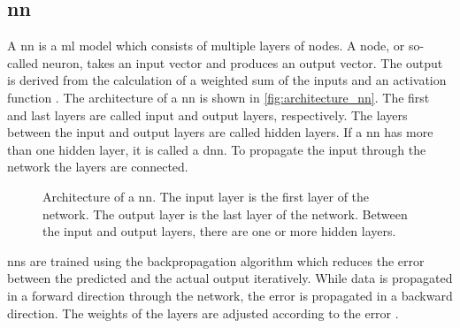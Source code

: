 \subsection{\acl*{nn}}\label{sec:neural_network}

A \ac{nn} is a \ac{ml} model which consists of multiple layers of nodes.
A node, or so-called neuron, takes an input vector and produces an output vector.
The output is derived from the calculation of a weighted sum of the inputs and an activation function \cite{KI2022}.
The architecture of a \ac{nn} is shown in \autoref{fig:architecture_nn}.
The first and last layers are called input and output layers, respectively.
The layers between the input and output layers are called hidden layers.
If a \ac{nn} has more than one hidden layer, it is called a \ac{dnn}.
To propagate the input through the network the layers are connected.

\begin{figure}[!htb] %
    \centering
    
    \caption[Architecture of a \ac{nn}]
    {Architecture of a \ac{nn}. 
    The input layer is the first layer of the network.
    The output layer is the last layer of the network.
    Between the input and output layers, there are one or more hidden layers.
    }
    \label{fig:architecture_nn}
\end{figure}

\acp{nn} are trained using the backpropagation algorithm which reduces the error between the predicted and the actual output iteratively.
While data is propagated in a forward direction through the network, the error is propagated in a backward direction.
The weights of the layers are adjusted according to the error \cite{KI2022}.
